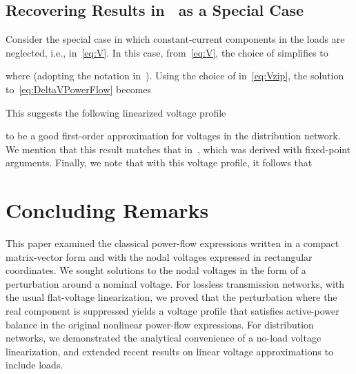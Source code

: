 \documentclass[10 pt, conference]{ieeeconf}
\begin{document}
\subsection{Recovering Results in~\cite{Bolognani-2015} as a Special Case}
Consider the special case in which constant-current components in the  loads are neglected, i.e.,  in~\eqref{eq:V}. In this case, from~\eqref{eq:V}, the choice of  simplifies to

where  (adopting the notation in~\cite{Bolognani-2015}).  Using the choice of  in~\eqref{eq:Vzip}, the solution to~\eqref{eq:DeltaVPowerFlow} becomes

This suggests the following linearized voltage profile 

to be a good first-order approximation for voltages in the distribution network. We mention that this result matches that in~\cite{Bolognani-2015}, which was derived with fixed-point arguments. Finally, we note that with this voltage profile, it follows that


\section{Concluding Remarks} \label{sec:Conclusions}
This paper examined the classical power-flow expressions written in a compact matrix-vector form and with the nodal voltages expressed in rectangular coordinates. We sought solutions to the nodal voltages in the form of a perturbation around a nominal voltage. For lossless transmission networks, with the usual flat-voltage linearization, we proved that the perturbation where the real component is suppressed yields a voltage profile that satisfies active-power balance in the original nonlinear power-flow expressions. For distribution networks, we demonstrated the analytical convenience of a no-load voltage linearization, and extended recent results on linear voltage approximations to include  loads.

\balance



\end{document}
